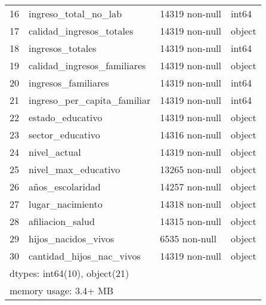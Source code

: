 \documentclass[a4paper]{article}
\begin{document}
\begin{table}[H]
\begin{center}
\begin{tabular}{clll}
    16 & ingreso\_total\_no\_lab        & 14319 non-null & int64  \\
    17 & calidad\_ingresos\_totales    & 14319 non-null & object \\
    18 & ingresos\_totales            & 14319 non-null & int64  \\
    19 & calidad\_ingresos\_familiares & 14319 non-null & object \\
    20 & ingresos\_familiares         & 14319 non-null & int64  \\
    21 & ingreso\_per\_capita\_familiar & 14319 non-null & int64  \\
    22 & estado\_educativo            & 14319 non-null & object \\
    23 & sector\_educativo            & 14316 non-null & object \\
    24 & nivel\_actual                & 14319 non-null & object \\
    25 & nivel\_max\_educativo         & 13265 non-null & object \\
    26 & años\_escolaridad            & 14257 non-null & object \\
    27 & lugar\_nacimiento            & 14318 non-null & object \\
    28 & afiliacion\_salud            & 14315 non-null & object \\
    29 & hijos\_nacidos\_vivos         & 6535 non-null  & object \\
    30 & cantidad\_hijos\_nac\_vivos    & 14319 non-null & object \\
    \multicolumn{4}{l}{dtypes: int64(10), object(21)}  \\ 
    \multicolumn{4}{l}{memory usage: 3.4+ MB} \\
    \end{tabular}\end{center}
    \end{table}
        
\end{document}
